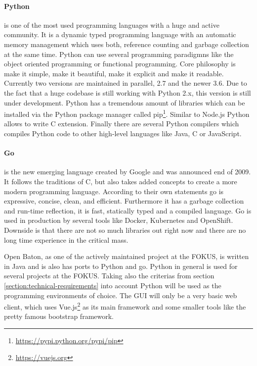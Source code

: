 \paragraph{Python} is one of the most used programming languages with a huge and active community.\autocite[cf.]{ProgramminLanguage:2017}
It is a dynamic typed programming language with an automatic memory management which uses both, reference counting and garbage collection at the same time.\autocite[cf.]{Python:GarbageCollection}
Python can use several programming paradigmns like the object oriented programming or functional programming.
Core philosophy is make it simple, make it beautiful, make it explicit and make it readable.
Currently two versions are maintained in parallel, 2.7 and the newer 3.6.
Due to the fact that a huge codebase is still working with Python 2.x, this version is still under development.\autocite[cf.]{Peterson:PythonReleaseSchedule}
Python has a tremendous amount of libraries which can be installed via the Python package manager called pip\footnote{\url{https://pypi.python.org/pypi/pip}}.
Similar to Node.js Python allows to write C extension.
Finally there are several Python compilers which compiles Python code to other high-level languages like Java, C or JavaScript.

\paragraph{Go} is the new emerging language created by Google and was announced end of 2009.
It follows the traditions of C, but also takes added concepts to create a more modern programming language.
According to their own statements go is expressive, concise, clean, and efficient.\autocite[cf.]{Go:Documentation}
Furthermore it has a garbage collection and run-time reflection, it is fast, statically typed and a compiled language.\autocite[cf.]{Go:Documentation}
Go is used in production by several tools like Docker, Kubernetes and OpenShift.
Downside is that there are not so much libraries out right now and there are no long time experience in the critical mass.

Open Baton, as one of the actively maintained project at the \ac{FOKUS}, is written in Java and is also has ports to Python and go.
Python in general is used for several projects at the \ac{FOKUS}.
Taking also the criterias from section \ref{section:technical-requirements} into account Python will be used as the  programming environments of choice.
The \ac{GUI} will only be a very basic web client, which uses Vue.js\footnote{\url{https://vuejs.org}} as its main framework and some smaller tools like the pretty famous bootstrap framework.


